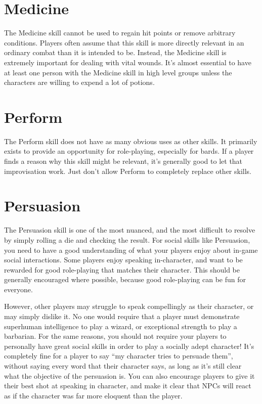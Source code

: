 \section{Medicine}
  The Medicine skill cannot be used to regain hit points or remove arbitrary conditions.
  Players often assume that this skill is more directly relevant in an ordinary combat than it is intended to be.
  Instead, the Medicine skill is extremely important for dealing with vital wounds.
  It's almost essential to have at least one person with the Medicine skill in high level groups unless the characters are willing to expend a lot of potions.

\section{Perform}
  The Perform skill does not have as many obvious uses as other skills.
  It primarily exists to provide an opportunity for role-playing, especially for bards.
  If a player finds a reason why this skill might be relevant, it's generally good to let that improvisation work.
  Just don't allow Perform to completely replace other skills.

\section{Persuasion}
  The Persuasion skill is one of the most nuanced, and the most difficult to resolve by simply rolling a die and checking the result.
  For social skills like Persuasion, you need to have a good understanding of what your players enjoy about in-game social interactions.
  Some players enjoy speaking in-character, and want to be rewarded for good role-playing that matches their character.
  This should be generally encouraged where possible, because good role-playing can be fun for everyone.

  However, other players may struggle to speak compellingly as their character, or may simply dislike it.
  No one would require that a player must demonstrate superhuman intelligence to play a wizard, or exceptional strength to play a barbarian.
  For the same reasons, you should not require your players to personally have great social skills in order to play a socially adept character!
  It's completely fine for a player to say ``my character tries to persuade them'', without saying every word that their character says, as long as it's still clear what the objective of the persuasion is.
  You can also encourage players to give it their best shot at speaking in character, and make it clear that NPCs will react as if the character was far more eloquent than the player.

